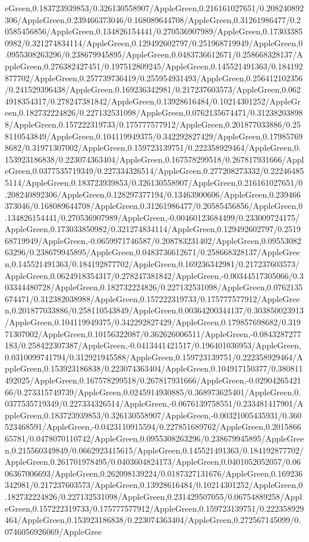 {\begin{tikzternal}
{eGreen,0.183723939853/0.326130558907/AppleGreen,0.216161027651/0.208240892306/AppleGreen,0.239466373046/0.168089644708/AppleGreen,0.31261986477/0.20585456856/AppleGreen,0.134826154441/0.270536907989/AppleGreen,0.173033850982/0.321274834114/AppleGreen,0.129492602797/0.251968719949/AppleGreen,0.0955308263296/0.238679945895/AppleGreen,0.0483736612671/0.258668328137/AppleGreen,0.276382427451/0.197512809245/AppleGreen,0.145521491363/0.184192877702/AppleGreen,0.257739736419/0.255954931493/AppleGreen,0.256412102356/0.241529396438/AppleGreen,0.169236342981/0.217237603573/AppleGreen,0.0624918354317/0.278247381842/AppleGreen,0.13928616484/0.10214301252/AppleGreen,0.182732224826/0.227132531098/AppleGreen,0.0762135674471/0.312382038988/AppleGreen,0.157222319733/0.175777577912/AppleGreen,0.201877033886/0.258110543849/AppleGreen,0.104119949375/0.342292827429/AppleGreen,0.179857698682/0.31971307002/AppleGreen,0.159723139751/0.222358929464/AppleGreen,0.153923186838/0.223074363404/AppleGreen,0.167578299518/0.267817931666/AppleGreen,0.0377535719349/0.227334326514/AppleGreen,0.277208273332/0.222464855114/AppleGreen,0.183723939853/0.326130558907/AppleGreen,0.216161027651/0.208240892306/AppleGreen,0.128297377194/0.13463900606/AppleGreen,0.239466373046/0.168089644708/AppleGreen,0.31261986477/0.20585456856/AppleGreen,0.134826154441/0.270536907989/AppleGreen,-0.00460123684499/0.233009724175/AppleGreen,0.173033850982/0.321274834114/AppleGreen,0.129492602797/0.251968719949/AppleGreen,-0.0659971746587/0.208783231402/AppleGreen,0.0955308263296/0.238679945895/AppleGreen,0.0483736612671/0.258668328137/AppleGreen,0.145521491363/0.184192877702/AppleGreen,0.169236342981/0.217237603573/AppleGreen,0.0624918354317/0.278247381842/AppleGreen,-0.00344517305066/0.303344480728/AppleGreen,0.182732224826/0.227132531098/AppleGreen,0.0762135674471/0.312382038988/AppleGreen,0.157222319733/0.175777577912/AppleGreen,0.201877033886/0.258110543849/AppleGreen,0.00364200344137/0.303850023913/AppleGreen,0.104119949375/0.342292827429/AppleGreen,0.179857698682/0.31971307002/AppleGreen,0.10156322087/0.362626006511/AppleGreen,-0.0843287277183/0.258422307387/AppleGreen,-0.0413441421517/0.196401036953/AppleGreen,0.0310099741794/0.312921945588/AppleGreen,0.159723139751/0.222358929464/AppleGreen,0.153923186838/0.223074363404/AppleGreen,0.104917150377/0.380811492025/AppleGreen,0.167578299518/0.267817931666/AppleGreen,-0.0290426542166/0.273315749739/AppleGreen,0.0245914930885/0.368973625401/AppleGreen,0.0377535719349/0.227334326514/AppleGreen,-0.0676139758551/0.233481417901/AppleGreen,0.183723939853/0.326130558907/AppleGreen,-0.00321005435931/0.360523468591/AppleGreen,-0.0423110915594/0.227851689762/AppleGreen,0.201586665781/0.0478070110742/AppleGreen,0.0955308263296/0.238679945895/AppleGreen,0.215560349849/0.0662923415615/AppleGreen,0.145521491363/0.184192877702/AppleGreen,0.261701978495/0.0403604824173/AppleGreen,0.0401052052057/0.0606367006693/AppleGreen,0.262098139224/0.0187327131676/AppleGreen,0.169236342981/0.217237603573/AppleGreen,0.13928616484/0.10214301252/AppleGreen,0.182732224826/0.227132531098/AppleGreen,0.231429507055/0.06754889258/AppleGreen,0.157222319733/0.175777577912/AppleGreen,0.159723139751/0.222358929464/AppleGreen,0.153923186838/0.223074363404/AppleGreen,0.272567145099/0.0746056926069/AppleGree}
\end{tikzternal}}
